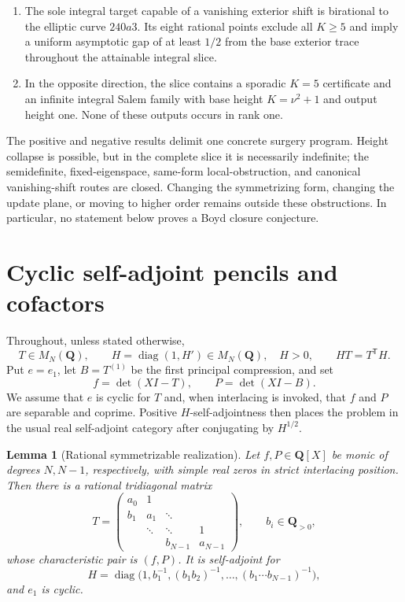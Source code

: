 \documentclass[11pt,reqno]{amsart}
\newtheorem{lemma}[theorem]{Lemma}
\theoremstyle{definition}
\theoremstyle{remark}
\newcommand{\Q}{\mathbf Q}
\begin{document}
\begin{enumerate}[label=\textup{(\roman*)}]
of the height-one target slice is a conic.  We parametrize it, obtain a finite
integer-square sieve at fixed $K$, and prove that every strict branch is
indefinite.
\item The sole integral target capable of a vanishing exterior shift is
birational to the elliptic curve $240a3$.  Its eight rational points exclude
all $K\geq5$ and imply a uniform asymptotic gap of at least $1/2$ from the
base exterior trace throughout the attainable integral slice.
\item In the opposite direction, the slice contains a sporadic $K=5$
certificate and an infinite integral Salem family with base height
$K=\nu^2+1$ and output height one.  None of these outputs occurs in rank one.
\end{enumerate}

The positive and negative results delimit one concrete surgery program.
Height collapse is possible, but in the complete slice it is necessarily
indefinite; the semidefinite, fixed-eigenspace, same-form local-obstruction,
and canonical vanishing-shift routes are closed.  Changing the symmetrizing
form, changing the update plane, or moving to higher order remains outside
these obstructions.  In particular, no statement below proves a Boyd closure
conjecture.

\section{Cyclic self-adjoint pencils and cofactors}

Throughout, unless stated otherwise,
\begin{equation}\label{eq:base}
 T\in M_N(\Q),\qquad H=\operatorname{diag}(1,H')\in M_N(\Q),\quad H>0,
 \qquad HT=T^{\mathsf T}H .
\end{equation}
Put $e=e_1$, let $B=T^{(1)}$ be the first principal compression, and set
\begin{equation}\label{eq:fP}
 f=\det(XI-T),\qquad P=\det(XI-B).
\end{equation}
We assume that $e$ is cyclic for $T$ and, when interlacing is invoked, that
$f$ and $P$ are separable and coprime.  Positive $H$-self-adjointness then
places the problem in the usual real self-adjoint category after conjugating
by $H^{1/2}$.

\begin{lemma}[Rational symmetrizable realization]\label{lem:realization}
Let $f,P\in\Q[X]$ be monic of degrees $N,N-1$, respectively, with simple
real zeros in strict interlacing position.  Then there is a rational
tridiagonal matrix
\[
 T=\begin{pmatrix}
 a_0&1&&\\ b_1&a_1&\ddots&\\ &\ddots&\ddots&1\\&&b_{N-1}&a_{N-1}
 \end{pmatrix},\qquad b_i\in\Q_{>0},
\]
whose characteristic pair is $(f,P)$.  It is self-adjoint for
\[
 H=\operatorname{diag}\bigl(1,b_1^{-1},(b_1b_2)^{-1},\ldots,
 (b_1\cdots b_{N-1})^{-1}\bigr),
\]
and $e_1$ is cyclic.
\end{lemma}
\end{document}
